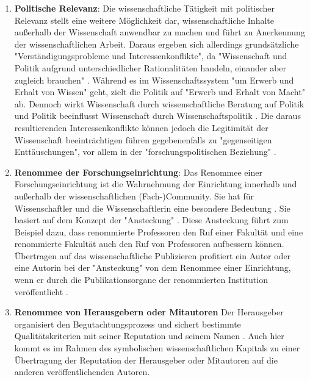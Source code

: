 \begin{enumerate}
\item \textbf{Politische Relevanz}: Die wissenschaftliche Tätigkeit mit politischer Relevanz stellt eine weitere Möglichkeit dar, wissenschaftliche Inhalte außerhalb der Wissenschaft anwendbar zu machen und führt zu Anerkennung der wissenschaftlichen Arbeit. Daraus ergeben sich allerdings grundsätzliche "Verständigungsprobleme und Interessenkonflikte", da  "Wissenschaft und Politik aufgrund unterschiedlicher Rationalitäten handeln, einander aber zugleich brauchen" \cite{Mayntz_1996}. Während es im Wissenschaftssystem "um Erwerb und Erhalt von Wissen" geht, zielt die Politik auf "Erwerb und Erhalt von Macht" \cite{Mayntz_1996} ab. Dennoch wirkt Wissenschaft durch wissenschaftliche Beratung auf Politik und  Politik beeinflusst Wissenschaft durch Wissenschaftspolitik \cite[:10]{Brown_2014}. Die daraus resultierenden Interessenkonflikte können jedoch die Legitimität der Wissenschaft beeinträchtigen \cite{weingart_2005_wissenschaft} \cite[:494]{Weber_1992} führen gegebenenfalls zu "gegenseitigen Enttäuschungen", vor allem in der "forschungspolitischen Beziehung" \cite{Mayntz_1996}.
\item \textbf{Renommee der Forschungseinrichtung}: Das Renommee einer Forschungseinrichtung ist die Wahrnehmung der Einrichtung innerhalb und außerhalb der wissenschaftlichen (Fach-)Community. Sie hat für Wissenschaftler und die Wissenschaftlerin eine besondere Bedeutung \cite{mayntz_2008_wissensproduktion}. Sie basiert auf dem Konzept der "Ansteckung" \cite{luhmann_1970_selbststeuerung}. Diese Ansteckung führt zum Beispiel dazu, dass renommierte Professoren den Ruf einer Fakultät und eine renommierte Fakultät auch den Ruf von Professoren aufbessern können. Übertragen auf das wissenschaftliche Publizieren profitiert ein Autor oder eine Autorin bei der "Ansteckung" von dem Renommee einer Einrichtung, wenn er durch die Publikationsorgane der renommierten Institution veröffentlicht \cite{lutz_2012_zugang}.
\item \textbf{Renommee von Herausgebern oder Mitautoren} Der Herausgeber organisiert den Begutachtungsprozess und sichert bestimmte Qualitätskriterien mit seiner Reputation und seinem Namen \cite{mueller_2009_peerreview}. Auch hier kommt es im Rahmen des symbolischen wissenschaftlichen Kapitals zu einer Übertragung der Reputation der Herausgeber oder Mitautoren auf die anderen veröffentlichenden Autoren.

\end{enumerate}

